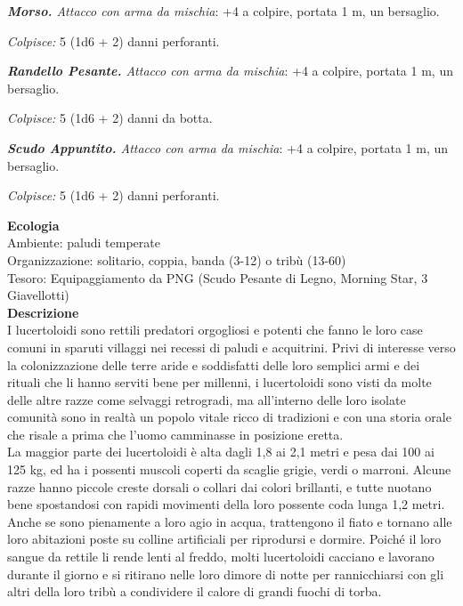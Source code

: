 \begin{multicols}{2}
\emph{\textbf{Morso.} Attacco con arma da mischia}: +4 a colpire, portata 1 m, un bersaglio.

\emph{Colpisce:} 5 (1d6 + 2) danni perforanti.

\emph{\textbf{Randello Pesante.} Attacco con arma da mischia}: +4 a colpire, portata 1 m, un bersaglio.

\emph{Colpisce:} 5 (1d6 + 2) danni da botta.

\emph{\textbf{Scudo Appuntito.} Attacco con arma da mischia}: +4 a colpire, portata 1 m, un bersaglio.

\emph{Colpisce:} 5 (1d6 + 2) danni perforanti.

\textbf{Ecologia}\\
Ambiente: paludi temperate\\
Organizzazione: solitario, coppia, banda (3-12) o tribù (13-60)\\
Tesoro: Equipaggiamento da PNG (Scudo Pesante di Legno, Morning Star, 3 Giavellotti)\\

\textbf{Descrizione}\\
I lucertoloidi sono rettili predatori orgogliosi e potenti che fanno le loro case comuni in sparuti villaggi nei recessi di paludi e acquitrini. Privi di interesse verso la colonizzazione delle terre aride e soddisfatti delle loro semplici armi e dei rituali che li hanno serviti bene per millenni, i lucertoloidi sono visti da molte delle altre razze come selvaggi retrogradi, ma all'interno delle loro isolate comunità sono in realtà un popolo vitale ricco di tradizioni e con una storia orale che risale a prima che l'uomo camminasse in posizione eretta.\\

La maggior parte dei lucertoloidi è alta dagli 1,8 ai 2,1 metri e pesa dai 100 ai 125 kg, ed ha i possenti muscoli coperti da scaglie grigie, verdi o marroni. Alcune razze hanno piccole creste dorsali o collari dai colori brillanti, e tutte nuotano bene spostandosi con rapidi movimenti della loro possente coda lunga 1,2 metri. Anche se sono pienamente a loro agio in acqua, trattengono il fiato e tornano alle loro abitazioni poste su colline artificiali per riprodursi e dormire. Poiché il loro sangue da rettile li rende lenti al freddo, molti lucertoloidi cacciano e lavorano durante il giorno e si ritirano nelle loro dimore di notte per rannicchiarsi con gli altri della loro tribù a condividere il calore di grandi fuochi di torba.\\


\end{multicols}
